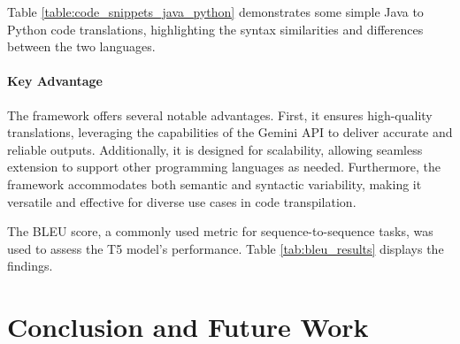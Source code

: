 \documentclass{dhbenelux}
\begin{document}
\begin{table}[h!]
\centering

\caption{Java to Python Code Snippets}
\label{table:code_snippets_java_python}
\end{table}

Table \ref{table:code_snippets_java_python} demonstrates some simple Java to Python code translations, highlighting the syntax similarities and differences between the two languages.

\paragraph{Key Advantage} 
The framework offers several notable advantages. First, it ensures high-quality translations, leveraging the capabilities of the Gemini API to deliver accurate and reliable outputs. Additionally, it is designed for scalability, allowing seamless extension to support other programming languages as needed. Furthermore, the framework accommodates both semantic and syntactic variability, making it versatile and effective for diverse use cases in code transpilation.


The BLEU score, a commonly used metric for sequence-to-sequence tasks, was used to assess the T5 model's performance. Table \ref{tab:bleu_results} displays the findings.

\section{Conclusion and Future Work}
\end{document}
